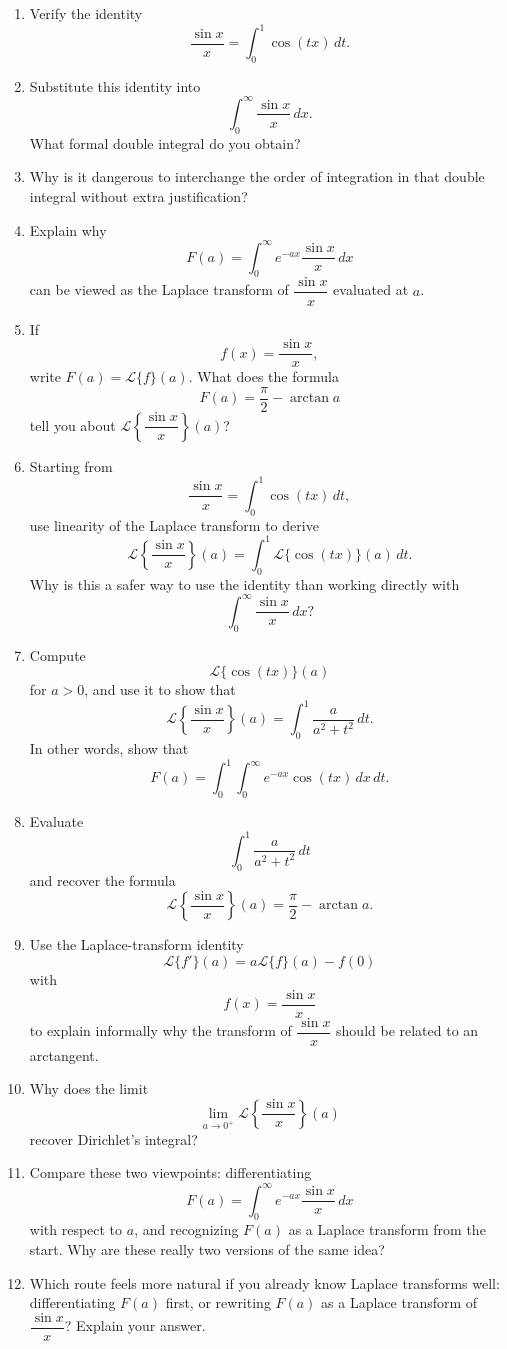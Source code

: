 \begin{enumerate}

  \item Verify the identity
    \[
      \frac{\sin x}{x}=\int_0^1 \cos(tx)\,dt.
    \]
  \item Substitute this identity into
    \[
      \int_0^\infty \frac{\sin x}{x}\,dx.
    \]
    What formal double integral do you obtain?
  \item Why is it dangerous to interchange the order of integration in that double integral without extra justification?


  \item Explain why
    \[
      F(a)=\int_0^\infty e^{-ax}\frac{\sin x}{x}\,dx
    \]
    can be viewed as the Laplace transform of $\dfrac{\sin x}{x}$ evaluated at $a$.
  \item If
    \[
      f(x)=\frac{\sin x}{x},
    \]
    write $F(a)=\mathcal{L}\{f\}(a)$. What does the formula
    \[
      F(a)=\frac{\pi}{2}-\arctan a
    \]
    tell you about $\mathcal{L}\!\left\{\dfrac{\sin x}{x}\right\}(a)$?
  \item Starting from
    \[
      \frac{\sin x}{x}=\int_0^1 \cos(tx)\,dt,
    \]
    use linearity of the Laplace transform to derive
    \[
      \mathcal{L}\!\left\{\frac{\sin x}{x}\right\}(a)
      =
      \int_0^1 \mathcal{L}\{\cos(tx)\}(a)\,dt.
    \]
    Why is this a safer way to use the identity than working directly with
    \[
      \int_0^\infty \frac{\sin x}{x}\,dx?
    \]
  \item Compute
    \[
      \mathcal{L}\{\cos(tx)\}(a)
    \]
    for $a>0$, and use it to show that
    \[
      \mathcal{L}\!\left\{\frac{\sin x}{x}\right\}(a)
      =
      \int_0^1 \frac{a}{a^2+t^2}\,dt.
    \]
    In other words, show that
    \[
      F(a)=\int_0^1 \int_0^\infty e^{-ax}\cos(tx)\,dx\,dt.
    \]
  \item Evaluate
    \[
      \int_0^1 \frac{a}{a^2+t^2}\,dt
    \]
    and recover the formula
    \[
      \mathcal{L}\!\left\{\frac{\sin x}{x}\right\}(a)
      =
      \frac{\pi}{2}-\arctan a.
    \]
  \item Use the Laplace-transform identity
    \[
      \mathcal{L}\{f'\}(a)=a\mathcal{L}\{f\}(a)-f(0)
    \]
    with
    \[
      f(x)=\frac{\sin x}{x}
    \]
    to explain informally why the transform of $\dfrac{\sin x}{x}$ should be related to an arctangent.
  \item Why does the limit
    \[
      \lim_{a\to 0^+}\mathcal{L}\!\left\{\frac{\sin x}{x}\right\}(a)
    \]
    recover Dirichlet's integral?
  \item Compare these two viewpoints:
    differentiating
    \[
      F(a)=\int_0^\infty e^{-ax}\frac{\sin x}{x}\,dx
    \]
    with respect to $a$, and recognizing $F(a)$ as a Laplace transform from the start.
    Why are these really two versions of the same idea?
  \item Which route feels more natural if you already know Laplace transforms well:
    differentiating $F(a)$ first, or rewriting $F(a)$ as a Laplace transform of
    $\dfrac{\sin x}{x}$? Explain your answer.


\end{enumerate}
